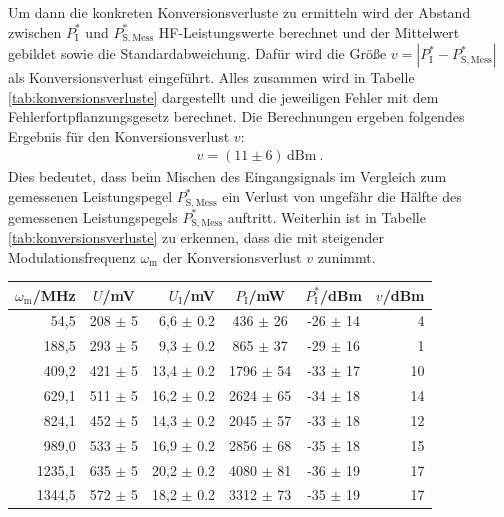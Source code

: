 Um dann die konkreten Konversionsverluste zu ermitteln wird der Abstand zwischen $P^*_\mathrm{I}$ und $P^*_\mathrm{S,Mess}$ HF-Leistungswerte berechnet und der Mittelwert gebildet sowie die Standardabweichung. Dafür wird die Größe $v = |P^*_\mathrm{I} - P^*_\mathrm{S,Mess}|$ als Konversionsverlust eingeführt. Alles zusammen wird in Tabelle \ref{tab:konversionsverluste} dargestellt und die jeweiligen Fehler mit dem Fehlerfortpflanzungsgesetz berechnet. Die Berechnungen ergeben folgendes Ergebnis für den Konversionsverlust $v$:
\begin{gather}
    \boxed{v = (11 \pm 6)\,\mathrm{dBm}}~.
\end{gather}
Dies bedeutet, dass beim Mischen des Eingangsignals im Vergleich zum gemessenen Leistungspegel $P^*_\mathrm{S,Mess}$ ein Verlust von ungefähr die Hälfte des gemessenen Leistungspegels $P^*_\mathrm{S,Mess}$ auftritt. Weiterhin ist in Tabelle \ref{tab:konversionsverluste} zu erkennen, dass die mit steigender Modulationsfrequenz $\omega_\mathrm{m}$ der Konversionsverlust $v$ zunimmt.

\begin{center}
    \captionsetup{type=table}
    \begin{tabular}{r | c r | c c | r }
        $\omega_\mathrm{m}$/MHz & $U$/mV & $U_\mathrm{I}$/mV & $P_\mathrm{I}$/mW & $P^*_\mathrm{I}$/dBm & $v$/dBm\\ \hline
        54,5   & 208 $\pm$ 5 & 6,6  $\pm$ 0.2 &  436 $\pm$ 26 & -26 $\pm$ 14 &  4\\
        188,5  & 293 $\pm$ 5 & 9,3  $\pm$ 0.2 &  865 $\pm$ 37 & -29 $\pm$ 16 &  1\\
        409,2  & 421 $\pm$ 5 & 13,4 $\pm$ 0.2 & 1796 $\pm$ 54 & -33 $\pm$ 17 & 10\\
        629,1  & 511 $\pm$ 5 & 16,2 $\pm$ 0.2 & 2624 $\pm$ 65 & -34 $\pm$ 18 & 14\\
        824,1  & 452 $\pm$ 5 & 14,3 $\pm$ 0.2 & 2045 $\pm$ 57 & -33 $\pm$ 18 & 12\\
        989,0  & 533 $\pm$ 5 & 16,9 $\pm$ 0.2 & 2856 $\pm$ 68 & -35 $\pm$ 18 & 15\\
        1235,1 & 635 $\pm$ 5 & 20,2 $\pm$ 0.2 & 4080 $\pm$ 81 & -36 $\pm$ 19 & 17\\
        1344,5 & 572 $\pm$ 5 & 18,2 $\pm$ 0.2 & 3312 $\pm$ 73 & -35 $\pm$ 19 & 17\\
    \end{tabular}
    \label{tab:konversionsverluste}
\end{center}


